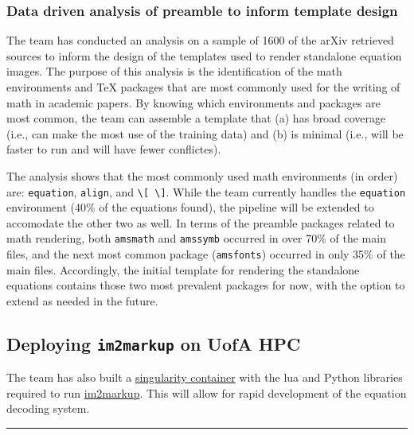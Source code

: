 \documentclass[article, 12pt, oneside]{memoir}
\begin{document}
\hypertarget{data-driven-analysis-of-preamble-to-inform-template-design}{%
\subsubsection{Data driven analysis of preamble to inform template
design}\label{data-driven-analysis-of-preamble-to-inform-template-design}}

The team has conducted an analysis on a sample of 1600 of the arXiv
retrieved sources to inform the design of the templates used to render
standalone equation images. The purpose of this analysis is the
identification of the math environments and TeX packages that are most
commonly used for the writing of math in academic papers. By knowing
which environments and packages are most common, the team can assemble a
template that (a) has broad coverage (i.e., can make the most use of the
training data) and (b) is minimal (i.e., will be faster to run and will
have fewer conflictes).

The analysis shows that the most commonly used math environments (in
order) are: \texttt{equation}, \texttt{align}, and
\texttt{\textbackslash{}{[}\ \textbackslash{}{]}}. While the team
currently handles the \texttt{equation} environment (40\% of the
equations found), the pipeline will be extended to accomodate the other
two as well. In terms of the preamble packages related to math
rendering, both \texttt{amsmath} and \texttt{amssymb} occurred in over
70\% of the main files, and the next most common package
(\texttt{amsfonts}) occurred in only 35\% of the main files.
Accordingly, the initial template for rendering the standalone equations
contains those two most prevalent packages for now, with the option to
extend as needed in the future.

\hypertarget{deploying-im2markup-on-uofa-hpc}{%
\subsection{\texorpdfstring{Deploying \texttt{im2markup} on UofA
HPC}{Deploying im2markup on UofA HPC}}\label{deploying-im2markup-on-uofa-hpc}}

The team has also built a
\href{https://www.sylabs.io/guides/3.0/user-guide/}{singularity
container} with the lua and Python libraries required to run
\href{https://github.com/harvardnlp/im2markup}{im2markup}. This will
allow for rapid development of the equation decoding system.

\begin{center}\rule{0.5\linewidth}{\linethickness}\end{center}
\end{document}
